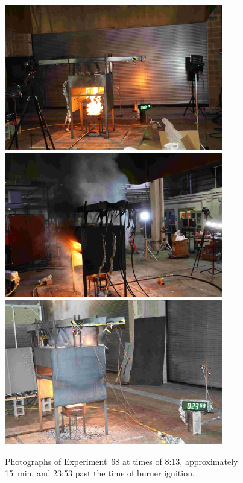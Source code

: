 \begin{figure}[p]
\centering
\includegraphics[height=2.50in]{../FIGURES/Test_68_Photo_1} \\ \vspace{0.1in}
\includegraphics[height=2.50in]{../FIGURES/Test_68_Photo_2} \\ \vspace{0.1in}
\includegraphics[height=2.50in]{../FIGURES/Test_68_Photo_3}
\caption[Photographs of Experiment~68]{Photographs of Experiment~68 at times of 8:13, approximately 15~min, and 23:53 past the time of burner ignition.}
\label{fig:Test_68_photos}
\end{figure}



